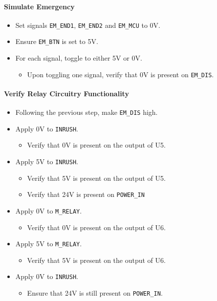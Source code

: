 \paragraph{Simulate Emergency} %
\begin{itemize}
	\item Set signals \texttt{EM\_END1}, \texttt{EM\_END2} and \texttt{EM\_MCU} to 0V.
	\item Ensure \texttt{EM\_BTN} is set to 5V.
	\item For each signal, toggle to either 5V or 0V.
	\begin{itemize}
		\item Upon toggling one signal, verify that 0V is present on \texttt{EM\_DIS}.
	\end{itemize}
\end{itemize}
\paragraph{Verify Relay Circuitry Functionality} %
\begin{itemize}
	\item Following the previous step, make \texttt{EM\_DIS} high.
	\item Apply 0V to \texttt{INRUSH}.
	\begin{itemize}
		\item Verify that 0V is present on the output of U5.
	\end{itemize}
	\item Apply 5V to \texttt{INRUSH}.
	\begin{itemize}
		\item Verify that 5V is present on the output of U5.
		\item Verify that 24V is present on \texttt{POWER\_IN}
	\end{itemize}
	\item Apply 0V to \texttt{M\_RELAY}.
	\begin{itemize}
		\item Verify that 0V is present on the output of U6.
	\end{itemize}
	\item Apply 5V to \texttt{M\_RELAY}.
	\begin{itemize}
		\item Verify that 5V is present on the output of U6.
	\end{itemize}
	\item Apply 0V to \texttt{INRUSH}.
	\begin{itemize}
		\item Ensure that 24V is still present on \texttt{POWER\_IN}.
	\end{itemize}
\end{itemize}
